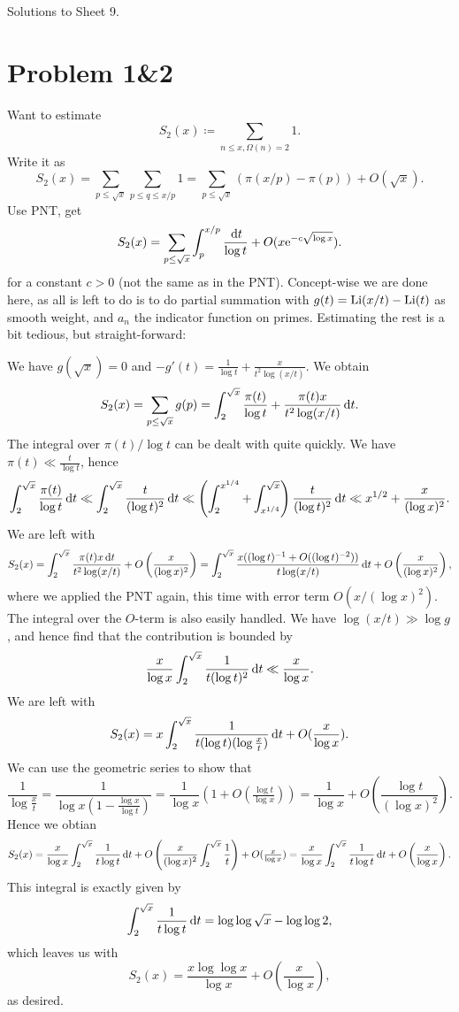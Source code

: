 \documentclass[a4paper,11pt]{article}
\author{Max von Consbruch}
\begin{document}
\begin{center}
    \huge{Solutions to Sheet 9.}
\end{center}

\section*{Problem 1\&2}

Want to estimate
\[
    S_2(x) \coloneqq \sum_{n \leq x, \Omega(n) = 2} 1.
\]
Write it as 
\[
    S_2(x) = \sum_{p \leq \sqrt x} \sum_{p \leq q \leq x/p} 1 =
    \sum_{p \leq \sqrt x} \left(\pi(x/p) - \pi(p)\right) + O(\sqrt x).
\]
Use PNT, get 
\[
    S_2(x) = \sum_{p \leq \sqrt x} \int_p^{x/p} \frac {\mathrm{\,d} t}{\log t} +
    O(x \mathrm e^{-c\sqrt{\log x}} ).
\]
for a constant $c>0$ (not the same as in the PNT).
Concept-wise we are done here, as all is left to do is to do partial summation
with $g(t) = \mathrm{Li}(x/t) - \mathrm{Li}(t)$ as smooth weight, and $a_n$ the indicator
function on primes. Estimating the rest is a bit tedious, but straight-forward:

We have $g(\sqrt x) = 0$ and $-g'(t) = \frac 1 {\log t} + \frac{x}{t^2
\log(x/t)}$. We obtain
\[
    S_2(x) = \sum_{p \leq \sqrt x} g(p) = 
    \int_2^{\sqrt x} \frac{\pi(t)}{\log t} + \frac{\pi(t) x}{t^2 \log(x/t)}
    \mathrm{\,d} t.
\]
The integral over $\pi(t)/\log t$ can be dealt with quite quickly. We have 
$\pi(t) \ll \frac t{\log t}$, hence
\[
    \int_2^{\sqrt x} \frac{\pi(t)}{\log t} \mathrm{\,d} t
    \ll \int_2^{\sqrt x} \frac t{(\log t)^2} \mathrm{\,d} t
    \ll \left( \int_{2}^{x^{1/4}} + 
    \int_{x^{1/4}}^{\sqrt x} \right )\frac{t}{(\log t)^2} \mathrm{\,d} t 
    \ll x^{1/2} + \frac x{(\log x)^2}.
\]
We are left with
\[
    S_2(x) = \int_2^{\sqrt x} \frac{\pi(t) x \mathrm{\,d} t}{t^2 \log(x/t)} + O\left(\frac x
    {(\log x)^2}\right) = \int_2^{\sqrt x} \frac{x((\log t)^{-1} + O((\log t)^{-2}))}{t
\log(x/t)} \mathrm{\,d} t + O\left(\frac x{(\log x)^2}\right),
\]
where we applied the PNT again, this time with error term $O(x/(\log x)^2)$. 
The integral over the $O$-term is also easily handled. We have $\log(x/t) \gg
\log g$, and hence find that the contribution is bounded by 
\[
    \frac x{\log x} \int_2^{\sqrt x} \frac 1{t (\log t)^2} \mathrm{\,d} t
    \ll \frac x{\log x}. 
\]
We are left with
\[
    S_2(x) = x \int_2^{\sqrt x} \frac 1{t (\log t)(\log \tfrac xt)} \mathrm{\,d} t 
    + O(\frac x{\log x}).
\]
We can use the geometric series to show that 
\[
    \frac 1{\log \tfrac xt} = \frac 1{\log x (1- \tfrac{\log x}{\log t})}
    = \frac 1{\log x} \left( 1 + O(\tfrac {\log t}{\log x}) \right)
    = \frac 1 {\log x} + O\left(\frac{\log t}{(\log x)^2} \right).
\]
Hence we obtian
\[
    S_2(x) = \frac x{\log x} \int_2^{\sqrt x} \frac 1{t \log t} \mathrm{\,d} t
    + O\left(\frac x{(\log x)^2} \int_2^{\sqrt x} \frac 1t \right)+ O(\tfrac x{\log x}) 
    = \frac x{\log x} \int_2^{\sqrt x} \frac 1{t \log t} \mathrm{\,d} t + O\left( \frac
    {x}{\log x} \right).
\]
This integral is exactly given by 
\[
    \int_2^{\sqrt x} \frac 1{t \log t} \mathrm{\,d} t = 
    \log \log \sqrt x - \log \log 2,
\]
which leaves us with
\[
    S_2(x) = \frac{x \log \log x}{\log x} + O\left( \frac x{\log x}\right),
\]
as desired.
\end{document}
